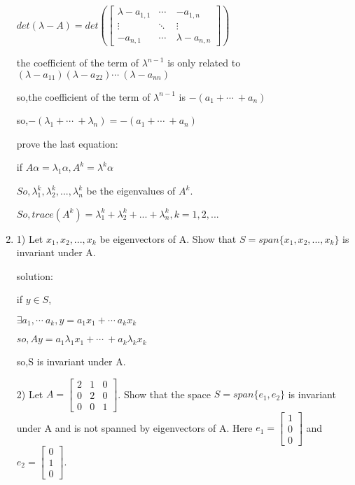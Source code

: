 \documentclass{article}
\begin{document}
\begin{enumerate}
    	$det(\lambda -A)=det(\begin{bmatrix} 
    		\lambda -a_{1,1} & \cdots\ &-a_{1,n} \\
    		\vdots &\ddots &\vdots \\
    		-a_{n,1}& \cdots\ &\lambda -a_{n,n} 
    	\end{bmatrix})$
    
        the coefficient of the term of $\lambda^{n-1}$ is only related to $(\lambda-a_{11})(\lambda-a_{22}) \cdots\ (\lambda-a_{nn})$
        
        so,the coefficient of the term of $\lambda^{n-1}$ is $-(a_1+\cdots\ +a_n)$
        
        so,$-(\lambda_1+\cdots\ +\lambda_n)=-(a_1+\cdots\ +a_n)$
    	
    	\[\]prove the last equation:$ $
    	
    	if $A \alpha =\lambda_1 \alpha ,A^k=\lambda ^k\alpha $
    	
    	$So, \lambda_1^k, \lambda_2^k, ..., \lambda_n^k$ be the eigenvalues of $A^k$.
    	
    	
    	$So,trace(A^k)=\lambda_1^k + \lambda_2^k + ... + \lambda_n^k,k=1,2,...$
		
		\item%
		1) Let $x_1, x_2, ..., x_k$ be eigenvectors of A. Show that $S = span\{x_1, x_2, ..., x_k\}$ is invariant under A.
		
		solution:$ $
		
		if $y\in S$,
		
		$\exists a_1 ,\cdots\ a_k,y=a_1 x_1+\cdots\ a_k x_k$
		
		$so,Ay=a_1\lambda _1 x_1+\cdots\ +a_k\lambda _k x_k$
		
		so,S is invariant under A.
		
		2) Let $A=\begin{bmatrix} 2&1&0\\0&2&0\\0&0&1\end{bmatrix}$. Show that the space $S=span\{e_1,e_2\}$ is invariant under A and is not spanned by eigenvectors of A. Here $e_1 = \begin{bmatrix} 1\\0\\0 \end{bmatrix}$ and $e_2 = \begin{bmatrix} 0\\1\\0 \end{bmatrix}$.
		

\end{enumerate}
\end{document}
